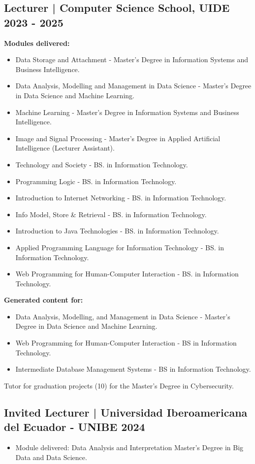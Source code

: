 \documentclass[11pt,a4paper]{article}
\begin{document}
\subsection*{Lecturer | Computer Science School, UIDE \hfill 2023 - 2025}
\textbf{Modules delivered:}
\begin{itemize}
    \item Data Storage and Attachment - Master's Degree in Information Systems and Business Intelligence.
    \item Data Analysis, Modelling and Management in Data Science - Master's Degree in Data Science and Machine Learning.
    \item Machine Learning - Master's Degree in Information Systems and Business Intelligence.
    \item Image and Signal Processing - Master's Degree in Applied Artificial Intelligence (Lecturer Assistant).
    \item Technology and Society - BS. in Information Technology.
    \item Programming Logic - BS. in Information Technology.
    \item Introduction to Internet Networking - BS. in Information Technology.
    \item Info Model, Store \& Retrieval - BS. in Information Technology.
    \item Introduction to Java Technologies - BS. in Information Technology.
    \item Applied Programming Language for Information Technology - BS. in Information Technology.
    \item Web Programming for Human-Computer Interaction - BS. in Information Technology.
\end{itemize}
\textbf{Generated content for:}
\begin{itemize}
    \item Data Analysis, Modelling, and Management in Data Science - Master's Degree in Data Science and Machine Learning.
    \item Web Programming for Human-Computer Interaction - BS in Information Technology.
    \item Intermediate Database Management Systems - BS in Information Technology.
\end{itemize}
Tutor for graduation projects (10) for the Master's Degree in Cybersecurity.

\vspace{0.5em}
\subsection*{Invited Lecturer | Universidad Iberoamericana del Ecuador - UNIBE \hfill 2024}
\begin{itemize}
    \item Module delivered: Data Analysis and Interpretation Master's Degree in Big Data and Data Science.
\end{itemize}
\end{document}

